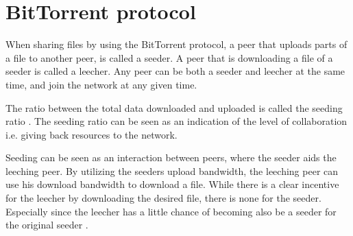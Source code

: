 \documentclass[11pt,twoside,a4paper,openright]{report}
\begin{document}
\hoffset=1.63cm
\oddsidemargin=0in
\evensidemargin=0in
\textwidth=5in

\setlength\parindent{0pt}

\pagestyle{empty}




\pagestyle{plain}





\setcounter{page}{4}


%



\setcounter{tocdepth}{2}
\tableofcontents


\setcounter{page}{1}


\section{BitTorrent protocol}
When sharing files by using the BitTorrent protocol, a peer that uploads parts of a file to another peer, is called a seeder.
A peer that is downloading a file of a seeder is called a leecher.
Any peer can be both a seeder and leecher at the same time, and join the network at any given time.

The ratio between the total data downloaded and uploaded is called the seeding ratio \cite{Cohen-bittorrent}.
The seeding ratio can be seen as an indication of the level of collaboration i.e. giving back resources to the network.

Seeding can be seen as an interaction between peers, where the seeder aids the leeching peer.
By utilizing the seeders upload bandwidth, the leeching peer can use his download bandwidth to download a file.
While there is a clear incentive for the leecher by downloading the desired file, there is none for the seeder.
Especially since the leecher has a little chance of becoming also be a seeder for the original seeder \cite{Lai-Incentives}.
\end{document}
